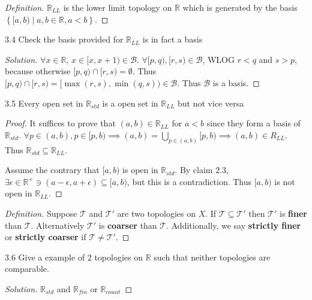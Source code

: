 \documentclass{article}
\newcommand*{\T}{\mathcal{T}}
\newcommand*{\B}{\mathcal{B}}
\newcommand{\R}{\mathbb{R}}
\newenvironment{solution}
{\renewcommand\qedsymbol{$\blacksquare$}\begin{proof}[Solution]}
{\end{proof}}
\newenvironment{definition}
{\renewcommand\qedsymbol{$\blacksquare$}\begin{proof}[Definition]}
{\end{proof}}
\begin{document}
\begin{definition}
    $\R_{L L}$ is the lower limit topology on $\R$ which is generated by the basis $\left\{ [a, b) \mid a, b \in \R, a < b \right\}$.    
\end{definition}

\bigskip

\begin{PROB}{3.4}\label{Problem 3.4.}
    Check the basis provided for $\R_{L L}$ is in fact a basis  
\end{PROB}
\begin{solution}
    $\forall x \in \R$, $x \in [x, x + 1) \in \B$. $\forall [p, q), [r, s) \in \B$, WLOG $r < q$ and $s > p$, because otherwise $[p, q) \cap [r, s) = \emptyset$. Thus $[p, q) \cap [r, s) = [\max(r, s), \min(q, s)) \in \B$. Thus $\B$ is a basis.             
\end{solution}
\bigskip

\begin{claim}{3.5}\label{Claim 3.5.}
    Every open set in $\R_{s t d}$ is a open set in $\R_{L L}$ but not vice versa  
\end{claim}
\begin{proof}
    It suffices to prove that $(a, b) \in \R_{L L}$ for $a < b$ since they form a basis of $\R_{s t d}$. $\forall p \in (a, b), p \in [p, b) \implies (a, b) = \bigcup_{p \in (a, b)}[p, b) \implies (a, b) \in R_{L L}$. Thus $\R_{s t d} \subseteq \R_{L L}$.
    
    Assume the contrary that $[a, b)$ is open in $\R_{s td}$. By claim 2.3, $\exists \epsilon \in \R^+ \ni (a - \epsilon, a + \epsilon) \subseteq [a, b)$, but this is a contradiction. Thus $[a,b)$ is not open in $\R_{L L}$.     
\end{proof}

\bigskip

\begin{definition}
    Suppose $\T$ and $\T'$ are two topologies on $X$. If $\T \subseteq \T'$ then $\T'$ is \textbf{finer} than $\T$. Alternatively $\T'$ is \textbf{coarser} than $\T$. Additionally, we say \textbf{strictly finer} or \textbf{strictly coarser} if $\T \neq \T'$.
\end{definition}

\bigskip

\begin{PROB}{3.6}\label{Problem 3.6.}
    Give a example of 2 topologies on $\R$ such that neither topologies are comparable.  
\end{PROB}
\begin{solution}
    $\R_{s td}$ and $\R_{fin}$ or $\R_{count}$   
\end{solution}
\end{document}
